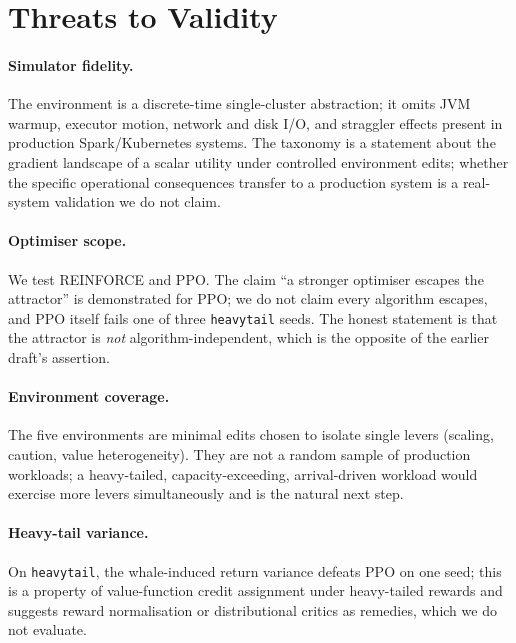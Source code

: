 \documentclass[10pt,twocolumn]{article}
\newcommand{\env}[1]{\texttt{#1}}
\begin{document}
\section{Threats to Validity}
\label{sec:threats}

\paragraph{Simulator fidelity.} The environment is a discrete-time single-cluster
abstraction; it omits JVM warmup, executor motion, network and disk I/O, and
straggler effects present in production Spark/Kubernetes systems. The taxonomy is
a statement about the gradient landscape of a scalar utility under controlled
environment edits; whether the specific operational consequences transfer to a
production system is a real-system validation we do not claim.

\paragraph{Optimiser scope.} We test REINFORCE and PPO. The claim ``a stronger
optimiser escapes the attractor'' is demonstrated for PPO; we do not claim every
algorithm escapes, and PPO itself fails one of three \env{heavytail} seeds. The
honest statement is that the attractor is \emph{not} algorithm-independent, which
is the opposite of the earlier draft's assertion.

\paragraph{Environment coverage.} The five environments are minimal edits chosen
to isolate single levers (scaling, caution, value heterogeneity). They are not a
random sample of production workloads; a heavy-tailed, capacity-exceeding,
arrival-driven workload would exercise more levers simultaneously and is the
natural next step.

\paragraph{Heavy-tail variance.} On \env{heavytail}, the whale-induced return
variance defeats PPO on one seed; this is a property of value-function credit
assignment under heavy-tailed rewards and suggests reward normalisation or
distributional critics as remedies, which we do not evaluate.

\end{document}
